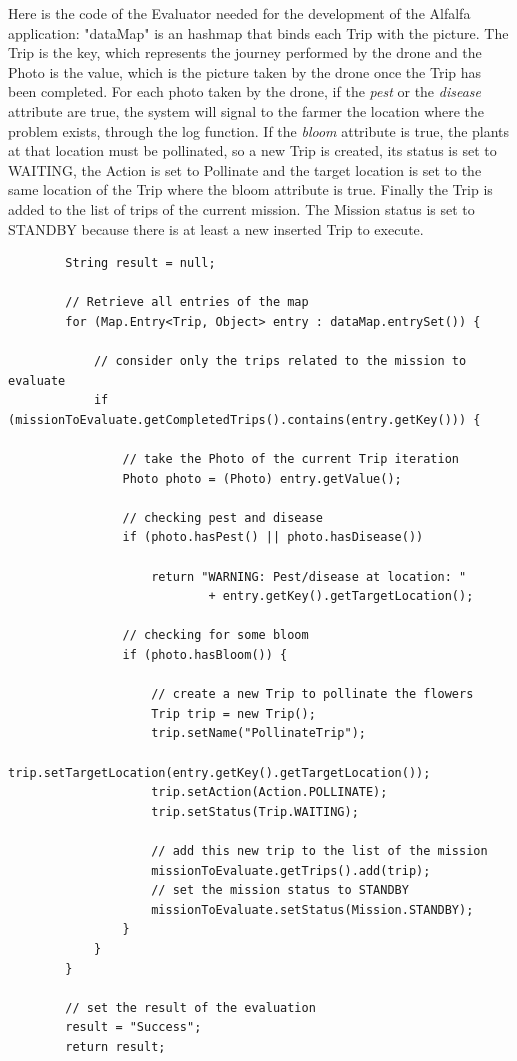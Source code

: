 Here is the code of the Evaluator needed for the development of the Alfalfa\cite{alfalfa} application:
"dataMap" is an hashmap that binds each Trip with the picture. The Trip is the key, which represents the journey performed by the drone and the Photo is the value, which is the picture taken by the drone once the Trip has been completed.
For each photo taken by the drone, if the \textit{pest} or the \textit{disease} attribute are true, the system will signal to the farmer the location where the problem exists, through the log function.
If the \textit{bloom} attribute is true, the plants at that location must be pollinated, so a new Trip is created, its status is set to WAITING, the Action is set to Pollinate and the target location is set to the same location of the Trip where the bloom attribute is true.
Finally the Trip is added to the list of trips of the current mission.
The Mission status is set to STANDBY because there is at least a new inserted Trip to execute.
\\

\begin{lstlisting}
		String result = null;

		// Retrieve all entries of the map
		for (Map.Entry<Trip, Object> entry : dataMap.entrySet()) {

			// consider only the trips related to the mission to evaluate
			if (missionToEvaluate.getCompletedTrips().contains(entry.getKey())) {
				
				// take the Photo of the current Trip iteration
				Photo photo = (Photo) entry.getValue();
				
				// checking pest and disease
				if (photo.hasPest() || photo.hasDisease())
					
					return "WARNING: Pest/disease at location: "
							+ entry.getKey().getTargetLocation();

				// checking for some bloom
				if (photo.hasBloom()) {

					// create a new Trip to pollinate the flowers
					Trip trip = new Trip();
					trip.setName("PollinateTrip");
					trip.setTargetLocation(entry.getKey().getTargetLocation());
					trip.setAction(Action.POLLINATE);
					trip.setStatus(Trip.WAITING);

					// add this new trip to the list of the mission
					missionToEvaluate.getTrips().add(trip);
					// set the mission status to STANDBY
					missionToEvaluate.setStatus(Mission.STANDBY);
				}
			}
		}

		// set the result of the evaluation
		result = "Success";
		return result;
\end{lstlisting}


